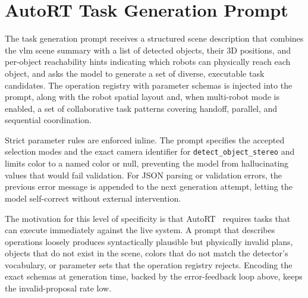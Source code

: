 \section{AutoRT Task Generation Prompt}
The task generation prompt receives a structured scene description that combines the \gls{vlm} scene summary with a list of detected objects, their 3D positions, and per-object reachability hints indicating which robots can physically reach each object, and asks the model to generate a set of diverse, executable task candidates. The operation registry with parameter schemas is injected into the prompt, along with the robot spatial layout and, when multi-robot mode is enabled, a set of collaborative task patterns covering handoff, parallel, and sequential coordination.

Strict parameter rules are enforced inline. The prompt specifies the accepted selection modes and the exact camera identifier for \texttt{detect\_object\_stereo} and limits color to a named color or null, preventing the model from hallucinating values that would fail validation. For JSON parsing or validation errors, the previous error message is appended to the next generation attempt, letting the model self-correct without external intervention.

The motivation for this level of specificity is that AutoRT~\cite{ahn2024autortembodiedfoundationmodels} requires tasks that can execute immediately against the live system. A prompt that describes operations loosely produces syntactically plausible but physically invalid plans, objects that do not exist in the scene, colors that do not match the detector's vocabulary, or parameter sets that the operation registry rejects. Encoding the exact schemas at generation time, backed by the error-feedback loop above, keeps the invalid-proposal rate low.

